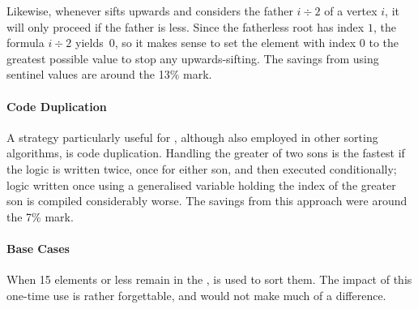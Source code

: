 Likewise, whenever \HS{} sifts upwards and considers the father \(i \div 2\) of a vertex \(i\), it will only proceed if the father is less.
Since the fatherless root has index \(1\), the formula \(i \div 2\) yields~\(0\), so it makes sense to set the element with index \(0\) to the greatest possible value to stop any upwards-sifting.
The savings from using sentinel values are around the 13\% mark.


\paragraph{Code Duplication}
A strategy particularly useful for \HS{}, although also employed in other sorting algorithms, is code duplication.
Handling the greater of two sons is the fastest if the logic is written twice, once for either son, and then executed conditionally;
logic written once using a generalised variable holding the index of the greater son is compiled considerably worse.
The savings from this approach were around the 7\% mark.


\paragraph{Base Cases}
When 15 elements or less remain in the \HS{}, \IS{} is used to sort them.
The impact of this one-time use is rather forgettable, and \ShS{} would not make much of a difference.




